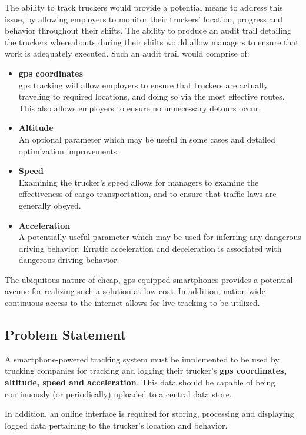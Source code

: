 The ability to track truckers would provide a potential means to address this issue, by allowing employers to monitor their truckers' location, progress and behavior throughout their shifts.
The ability to produce an audit trail detailing the truckers whereabouts during their shifts would allow managers to ensure that work is adequately executed. Such an audit trail would comprise of:
\begin{itemize}
\item \textbf{\ac{gps} coordinates\\}
\ac{gps} tracking will allow employers to ensure that truckers are actually traveling to required locations, and doing so via the most effective routes. This also allows employers to ensure no unnecessary detours occur.
\item \textbf{Altitude\\}
An optional parameter which may be useful in some cases and detailed optimization improvements.
\item \textbf{Speed\\}
Examining the trucker's speed allows for managers to examine the effectiveness of cargo transportation, and to ensure that traffic laws are generally obeyed.
\item \textbf{Acceleration\\}
A potentially useful parameter which may be used for inferring any dangerous driving behavior. 
Erratic acceleration and deceleration is associated with dangerous driving behavior.
\end{itemize}

The ubiquitous nature of cheap, \ac{gps}-equipped smartphones provides a potential avenue for realizing such a solution at low cost.
In addition, nation-wide continuous access to the internet allows for live tracking to be utilized. 

\subsection{Problem Statement}
A smartphone-powered tracking system must be implemented to be used by trucking companies for tracking and logging their trucker's \textbf{\ac{gps} coordinates, altitude, speed and acceleration}.
This data should be capable of being continuously (or periodically) uploaded to a central data store.

In addition, an online interface is required for storing, processing and displaying logged data pertaining to the trucker's location and behavior.

